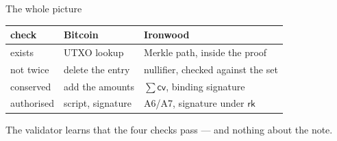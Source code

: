 \documentclass[aspectratio=169,11pt]{beamer}
\newcommand{\cvsym}{\ensuremath{\mathsf{cv}}}
\newcommand{\rksym}{\ensuremath{\mathsf{rk}}}
\begin{document}
\begin{frame}{The whole picture}
\begin{center}
\begin{tabular}{@{}lll@{}}
\toprule
check & Bitcoin & Ironwood \\
\midrule
exists & UTXO lookup & Merkle path, inside the proof \\
not twice & delete the entry & nullifier, checked against the set \\
conserved & add the amounts & $\sum \cvsym$, binding signature \\
authorised & script, signature & A6/A7, signature under $\rksym$ \\
\bottomrule
\end{tabular}
\end{center}
\vfill
The validator learns that the four checks pass --- and nothing about the
note.
\end{frame}
\end{document}
